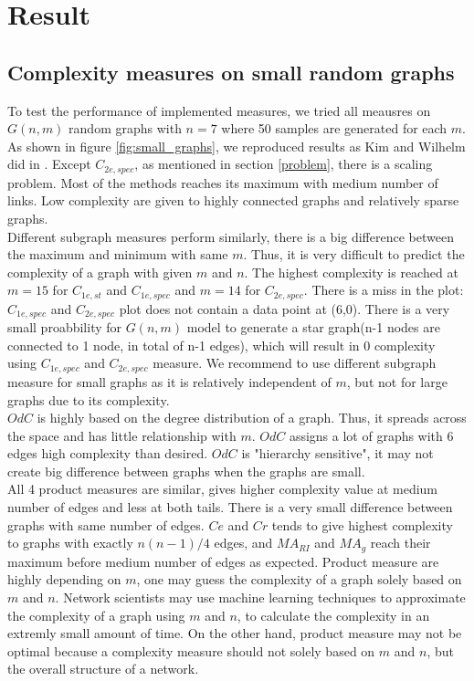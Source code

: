 \documentclass[12pt]{article}
\begin{document}
\section{Result}
\subsection{Complexity measures on small random graphs}
To test the performance of implemented measures, we tried all meausres on $G(n,m)$ random graphs with $n=7$ where 50 samples are generated for each $m$. As shown in figure \ref{fig:small_graphs}, we reproduced results as Kim and Wilhelm did in \cite{KIM20082637}. Except $C_{2e,spec}$, as mentioned in section \ref{problem}, there is a scaling problem. Most of the methods reaches its maximum with medium number of links. Low complexity are given to highly connected graphs and relatively sparse graphs.
\\
Different subgraph measures perform similarly, there is a big difference between the maximum and minimum with same $m$. Thus, it is very difficult to predict the complexity of a graph with given $m$ and $n$. The highest complexity is reached at $m=15$ for $C_{1e,st}$ and $C_{1e,spec}$ and $m=14$ for $C_{2e,spec}$. There is a miss in the plot: $C_{1e,spec}$ and $C_{2e,spec}$ plot does not contain a data point at (6,0). There is a very small proabbility for $G(n,m)$ model to generate a star graph(n-1 nodes are connected to 1 node, in total of n-1 edges), which will result in 0 complexity using $C_{1e,spec}$ and $C_{2e,spec}$ measure. We recommend to use different subgraph measure for small graphs as it is relatively independent of $m$, but not for large graphs due to its complexity.\\
$OdC$ is highly based on the degree distribution of a graph.\cite{odc} Thus, it spreads across the space and has little relationship with $m$. $OdC$ assigns a lot of graphs with 6 edges high complexity than desired. $OdC$ is "hierarchy sensitive", it may not create big difference between graphs when the graphs are small.\\
All 4 product measures are similar, gives higher complexity value at medium number of edges and less at both tails. There is a very small difference between graphs with same number of edges. $Ce$ and $Cr$ tends to give highest complexity to graphs with exactly $n(n-1)/4$ edges, and $MA_{RI}$ and $MA_{g}$ reach their maximum before medium number of edges as expected. Product measure are highly depending on $m$, one may guess the complexity of a graph solely based on $m$ and $n$. Network scientists may use machine learning techniques to approximate the complexity of a graph using $m$ and $n$, to calculate the complexity in an extremly small amount of time. On the other hand, product measure may not be optimal because a complexity measure should not solely based on $m$ and $n$, but the overall structure of a network.
\end{document}
